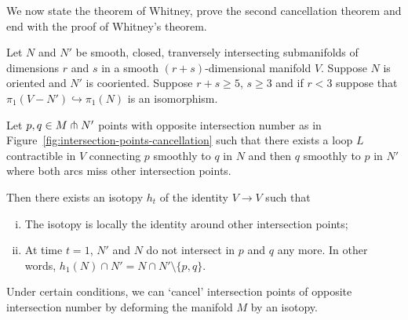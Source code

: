 We now state the theorem of Whitney, prove the second cancellation theorem and end with the proof of Whitney's theorem.
\begin{theorem}[Whitney]
    Let $N$ and  $N'$ be smooth, closed, tranversely intersecting submanifolds of dimensions  $r$ and $s$ in a smooth  $(r+s)$-dimensional manifold $V$.
    Suppose  $N$ is oriented and  $N'$ is cooriented.
    Suppose $r+s \ge 5$, $s\ge 3$ and if $r<3$ suppose that $\pi_1(V - N') \hookrightarrow \pi_1(N)$ is an isomorphism.

    Let $p, q \in  M \pitchfork N'$ points with opposite intersection number as in Figure~\ref{fig:intersection-points-cancellation} such that there exists a loop $L$ contractible in  $V$ connecting  $p$ smoothly to $q$ in  $N$  and then $q$ smoothly to  $p$ in $N'$ where both arcs miss other intersection points.

    Then there exists an isotopy $h_t$ of the identity $V \to V$ such that
    \begin{enumerate}[(i)]
        \item The isotopy is locally the identity around other intersection points;
        \item At time  $t = 1$,  $N'$ and  $N$ do not intersect in $p$ and $q$  any more.  In other words, $h_1(N) \cap N' = N \cap  N' \setminus \{ p, q\} $.
    \end{enumerate}
\end{theorem}
\begin{marginfigure}[-6.5cm]
    \centering
    \caption{
    Under certain conditions, we can `cancel' intersection points of opposite intersection number by deforming the manifold $M$ by an isotopy.}
    \label{fig:intersection-points-cancellation}
\end{marginfigure}
